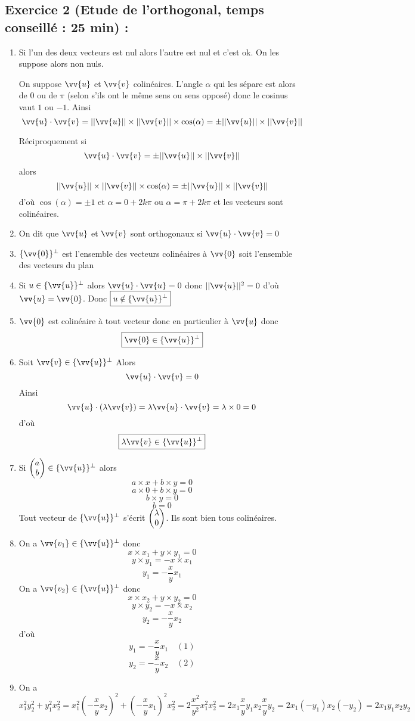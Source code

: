 \subsection*{Exercice 2 (Etude de l'orthogonal, temps conseillé : 25 min) : }
\begin{enumerate}
\item 
Si l'un des deux vecteurs est nul alors l'autre est nul et c'est ok. On les suppose alors non nuls.

On suppose $\vv{u}$ et $\vv{v}$ colinéaires. L'angle $\alpha$ qui les sépare est alors de $0$ ou de $\pi$ (selon s'ils ont le même sens ou sens opposé) donc le cosinus vaut $1$ ou $-1$. Ainsi $$\vv{u}\cdot\vv{v} = ||\vv{u}|| \times ||\vv{v}|| \times \cos(\alpha) = \pm ||\vv{u}|| \times ||\vv{v}||$$

Réciproquement si $$\vv{u}\cdot\vv{v} =\pm ||\vv{u}|| \times ||\vv{v}||$$ alors $$||\vv{u}|| \times ||\vv{v}|| \times \cos(\alpha) = \pm ||\vv{u}|| \times ||\vv{v}||$$ d'où $\cos(\alpha) = \pm 1$ et $\alpha = 0 + 2k\pi$ ou $\alpha = \pi + 2k\pi$ et les vecteurs sont colinéaires.
\item On dit que $\vv{u}$ et $\vv{v}$ sont orthogonaux si $\vv{u}\cdot \vv{v} = 0$ 
\item $\{\vv{0}\}^\perp$ est l'ensemble des vecteurs colinéaires à $\vv{0}$ soit l'ensemble des vecteurs du plan
\item Si $u \in \{\vv{u}\}^\perp$ alors $\vv{u}\cdot \vv{u} = 0$ donc $||\vv{u}||^2 = 0$ d'où $\vv{u} = \vv{0}$. Donc $\boxed{u \notin \{\vv{u}\}^\perp}$
\item $\vv{0}$ est colinéaire à tout vecteur donc en particulier à $\vv{u}$ donc $$\boxed{\vv{0} \in \{\vv{u}\}^\perp}$$
\item Soit $\vv{v} \in \{\vv{u}\}^\perp$ Alors $$\vv{u} \cdot \vv{v} = 0$$ Ainsi $$\vv{u} \cdot (\lambda\vv{v}) = \lambda \vv{u} \cdot \vv{v} = \lambda \times 0 = 0$$ d'où $$\boxed{\lambda \vv{v} \in \{\vv{u}\}^\perp}$$
\item  Si $\covec{a}{b} \in \{\vv{u}\}^\perp$ alors $$a\times x + b \times y = 0$$ $$a \times 0 + b \times y = 0$$ $$b\times y =0$$ $$b=0$$ Tout vecteur de $\{\vv{u}\}^\perp$ s'écrit $\begin{pmatrix}\lambda \\0 \end{pmatrix}$. Ils sont bien tous colinéaires.
\item On a $\vv{v_1} \in \{\vv{u}\}^\perp$ donc 
$$x\times x_1 + y\times y_1 = 0$$
$$y\times y_1 = -x\times x_1$$
$$y_1 = -\frac{x}{y}x_1$$
On a $\vv{v_2} \in \{\vv{u}\}^\perp$ donc 
$$x\times x_2 + y\times y_2 = 0$$
$$y\times y_2 = -x\times x_2$$
$$y_2 = -\frac{x}{y}x_2$$
d'où
$$\boxed{y_1 = -\frac{x}{y}x_1} \quad (1)$$
$$\boxed{y_2 = -\frac{x}{y}x_2} \quad (2)$$
\item On a
$$x_1^2y_2^2 + y_1^2x_2^2 = x_1^2 \left(-\frac{x}{y}x_2\right)^2 + \left(-\frac{x}{y}x_1\right)^2x_2^2 =2 \frac{x^2}{y^2}x_1^2x_2^2 = 2x_1 \frac{x}{y}y_1 x_2 \frac{x}{y}y_2 = 2x_1(-y_1)x_2(-y_2) =2x_1y_1x_2y_2$$


\end{enumerate}
